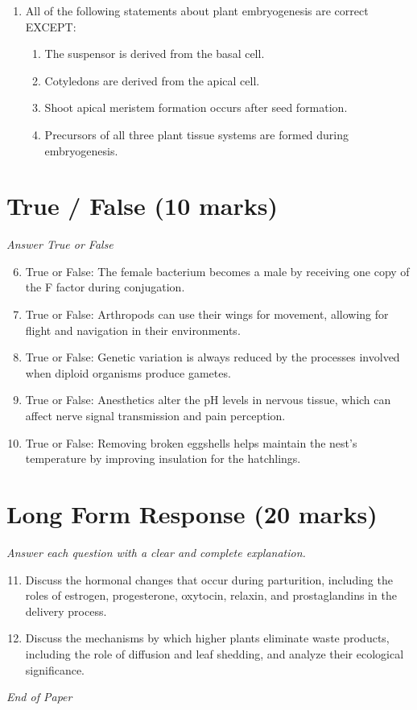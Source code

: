 \documentclass[12pt]{article}
\begin{document}
\begin{enumerate}[label=\arabic*.]
\begin{enumerate}[label=(\alph*)]
    \item Animals migrate based on the patterns of the stars alone.
    \item Animals follow changes in air pressure for migration.
    \item Animals use temperature changes for migration.
\end{enumerate}
\item All of the following statements about plant embryogenesis are correct EXCEPT:
\begin{enumerate}[label=(\alph*)]
    \item The suspensor is derived from the basal cell.
    \item Cotyledons are derived from the apical cell.
    \item Shoot apical meristem formation occurs after seed formation.
    \item Precursors of all three plant tissue systems are formed during embryogenesis.
\end{enumerate}
\end{enumerate}

\section*{True / False (10 marks)}
\textit{Answer True or False}
\begin{enumerate}[label=\arabic*.]
\setcounter{enumi}{5}
\item True or False: The female bacterium becomes a male by receiving one copy of the F factor during conjugation.
\item True or False: Arthropods can use their wings for movement, allowing for flight and navigation in their environments.
\item True or False: Genetic variation is always reduced by the processes involved when diploid organisms produce gametes.
\item True or False: Anesthetics alter the pH levels in nervous tissue, which can affect nerve signal transmission and pain perception.
\item True or False: Removing broken eggshells helps maintain the nest's temperature by improving insulation for the hatchlings.
\end{enumerate}

\section*{Long Form Response (20 marks)}
\textit{Answer each question with a clear and complete explanation.}
\begin{enumerate}[label=\arabic*.]
\setcounter{enumi}{10}
\item Discuss the hormonal changes that occur during parturition, including the roles of estrogen, progesterone, oxytocin, relaxin, and prostaglandins in the delivery process.
\item Discuss the mechanisms by which higher plants eliminate waste products, including the role of diffusion and leaf shedding, and analyze their ecological significance.
\end{enumerate}

\vfill
\noindent\textit{End of Paper}
\end{document}

